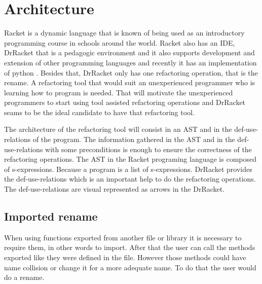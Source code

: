 
% 
% 

\section{Architecture}


Racket is a dynamic language that is known of being used as an introductory programming course in schools around the world. 
Racket also has an IDE, DrRacket that is a pedagogic environment \cite{drscheme_pegadogy} and it also supports development and extension of other programming languages \cite{tobin2011languages} and recently it has an implementation of python \cite{ramos2014implementation}.
Besides that, DrRacket only has one refactoring operation, that is the rename.
A refactoring tool that would suit an unexperienced programmer who is learning how to program is needed. 
That will motivate the unexperienced programmers to start using tool assisted refactoring operations and DrRacket seams to be the ideal candidate to have that refactoring tool.


The architecture of the refactoring tool will consist in an AST and in the def-use-relations of the program.
The information gathered in the AST and in the def-use-relations with some preconditions is enough to ensure the correctness of the refactoring operations.
The AST in the Racket programing language is composed of s-expressions. Because a program is a list of s-expressions.
DrRacket provides the def-use-relations which is an important help to do the refactoring operations. The def-use-relations are visual represented as arrows in the DrRacket.




\subsection{Imported rename}
When using functions exported from another file or library it is necessary to require them, in other words to import.
After that the user can call the methods exported like they were defined in the file.
However those methods could have name collision or change it for a more adequate name. To do that the user would do a rename.

